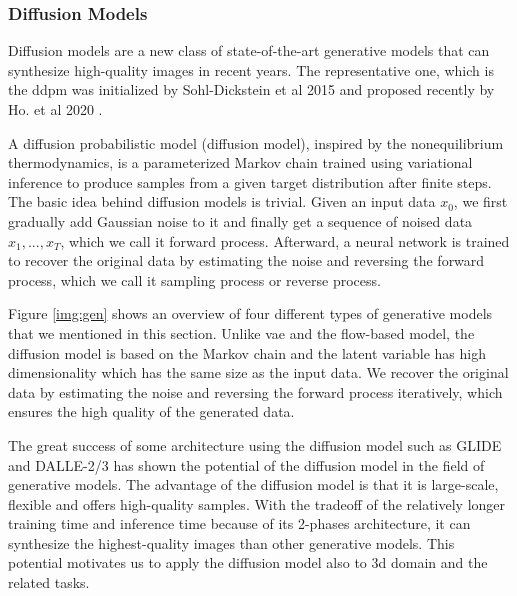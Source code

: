 \documentclass[12pt,DIV14,BCOR12mm,a4paper,footinclude=false,headinclude,parskip=half-,twoside,openright,cleardoublepage=empty,toc=index,bibliography=totoc,listof=totoc]{scrreprt}
\numberwithin{equation}{chapter}
\begin{document}
\subsubsection{Diffusion Models}
Diffusion models are a new class of state-of-the-art generative models that can synthesize high-quality images in recent years. The representative one, which is the \gls{ddpm} was initialized by Sohl-Dickstein et al 2015 \cite{sohldickstein2015deep} and proposed recently by Ho. et al 2020 \cite{ho2020denoising}. 

A diffusion probabilistic model (diffusion model), inspired by the nonequilibrium thermodynamics, is a parameterized Markov chain trained using variational inference to produce samples from a given target distribution after finite steps. The basic idea behind diffusion models is trivial. Given an input data $x_{0}$, we first gradually add Gaussian noise to it and finally get a sequence of noised data $x_{1},...,x_{T}$, which we call it forward process. Afterward, a neural network is trained to recover the original data by estimating the noise and reversing the forward process, which we call it sampling process or reverse process.

Figure \ref{img:gen} shows an overview of four different types of generative models that we mentioned in this section. Unlike \gls{vae} and the flow-based model, the diffusion model is based on the Markov chain and the latent variable has high dimensionality which has the same size as the input data. We recover the original data by estimating the noise and reversing the forward process iteratively, which ensures the high quality of the generated data.

The great success of some architecture using the diffusion model such as GLIDE \cite{nichol2022glide} and DALLE-2/3 \cite{ramesh2022hierarchical} has shown the potential of the diffusion model in the field of generative models. The advantage of the diffusion model is that it is large-scale, flexible and offers high-quality samples. With the tradeoff of the relatively longer training time and inference time because of its 2-phases architecture, it can synthesize the highest-quality images than other generative models. This potential motivates us to apply the diffusion model also to \gls{3d} domain and the related tasks.
\end{document}
